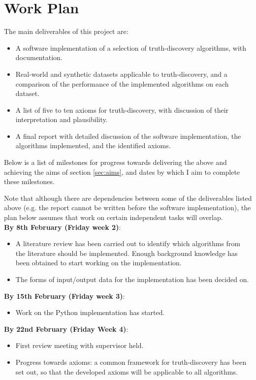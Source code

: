 \documentclass{article}
\begin{document}
\section{Work Plan}

The main deliverables of this project are:
\begin{itemize}

\item A software implementation of a selection of truth-discovery algorithms,
with documentation.
\item Real-world and synthetic datasets applicable to truth-discovery, and a
comparison of the performance of the implemented algorithms on each dataset.
\item A list of five to ten axioms for truth-discovery, with discussion of
their interpretation and plausibility.
\item A final report with detailed discussion of the software implementation,
the algorithms implemented, and the identified axioms.

\end{itemize}

Below is a list of milestones for progress towards delivering the above and
achieving the aims of section \ref{sec:aims}, and dates by which I aim to
complete these milestones.

Note that although there are dependencies between some of the deliverables
listed above (e.g. the report cannot be written before the software
implementation), the plan below assumes that work on certain independent tasks
will overlap.\\

\textbf{By 8th February (Friday week 2)}:
\begin{itemize}
\item A literature review has been carried out to identify which algorithms
from the literature should be implemented. Enough background knowledge has been
obtained to start working on the implementation.
\item The forms of input/output data for the implementation has been decided on.
\end{itemize}

\textbf{By 15th February (Friday week 3)}:
\begin{itemize}
\item Work on the Python implementation has started.
\end{itemize}

\textbf{By 22nd February (Friday Week 4)}:
\begin{itemize}
\item First review meeting with supervisor held.
\item Progress towards axioms: a common framework for truth-discovery has been
set out, so that the developed axioms will be applicable to all algorithms.
\end{itemize}
\end{document}
